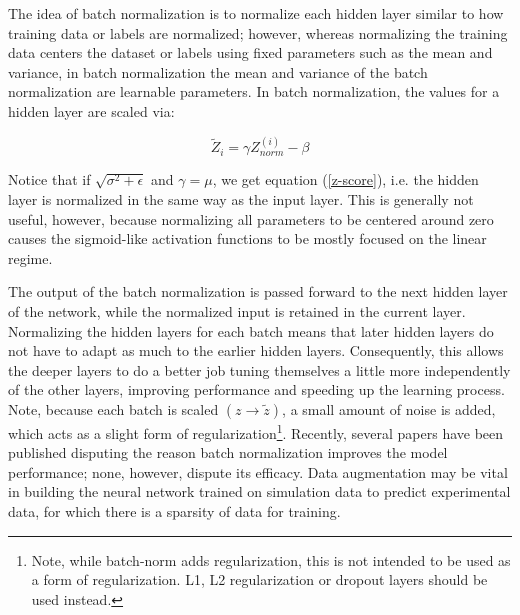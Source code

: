 The idea of batch normalization is to normalize each hidden layer similar to how training data or labels are normalized; however, whereas normalizing the training data centers the dataset or labels using fixed parameters such as the mean and variance, in batch normalization the mean and variance of the batch normalization are learnable parameters. In batch normalization, the values for a hidden layer are scaled via:

\begin{equation}
\widetilde{Z}_i = \gamma Z_{norm}^{(i)} - \beta
\end{equation}

\noindent Notice that if $\sqrt{\sigma^2 + \epsilon}$ and $\gamma = \mu$, we get equation (\ref{z-score}), i.e. the hidden layer is normalized in the same way as the input layer. This is generally not useful, however, because normalizing all parameters to be centered around zero causes the sigmoid-like activation functions to be mostly focused on the linear regime.



The output of the batch normalization is passed forward to the next hidden layer of the network, while the normalized input is retained in the current layer. Normalizing the hidden layers for each batch means that later hidden layers do not have to adapt as much to the earlier hidden layers. Consequently, this allows the deeper layers to do a better job tuning themselves a little more independently of the other layers, improving performance and speeding up the learning process. Note, because each batch is scaled $(z \rightarrow \widetilde{z})$, a small amount of noise is added, which acts as a slight form of regularization\footnote{Note, while batch-norm adds regularization, this is not intended to be used as a form of regularization. L1, L2 regularization or dropout layers should be used instead.}. Recently, several papers  \cite{batch-norm-conference} \cite{whybatchnorm2} \cite{whybatchnorm3} have been published disputing the reason batch normalization improves the model performance; none, however, dispute its efficacy. Data augmentation may be vital in building the neural network trained on simulation data to predict experimental data, for which there is a sparsity of data for training. 

